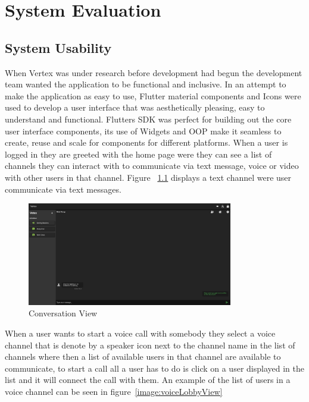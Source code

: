 \chapter{System Evaluation}

\section{System Usability}
When Vertex was under research before development had begun the development team wanted the application to be functional and inclusive. In an attempt to make the application as easy to use, Flutter material components and Icons were used to develop a user interface that was aesthetically pleasing, easy to understand and functional. Flutters SDK was perfect for building out the core user interface components, its use of Widgets and OOP make it seamless to create, reuse and scale for components for different platforms. When a user is logged in they are greeted with the home page were they can see a list of channels they can interact with to communicate via text message, voice or video with other users in that channel. Figure ~\ref{image:convertionView} displays a text channel were user communicate via text messages.

\begin{figure}[h!]
    \caption{Conversation View}
    \label{image:convertionView}
    \centering
    \includegraphics[width=0.8\textwidth]{images/screenshotsOfPages/conversationScreen.png}
\end{figure}

When a user wants to start a voice call with somebody they select a voice channel that is denote by a speaker icon next to the channel name in the list of channels where then a list of available users in that channel are available to communicate, to start a call all a user has to do is click on a user displayed in the list and it will connect the call with them. An example of the list of users in a voice channel can be seen in figure~\ref{image:voiceLobbyView}


